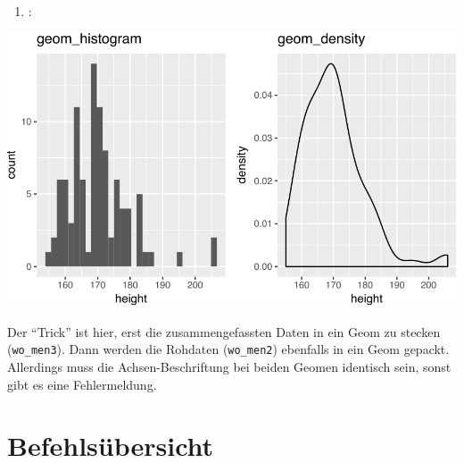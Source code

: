 \documentclass[12pt,ngerman,]{book}
\newenvironment{Shaded}{\begin{snugshade}}{\end{snugshade}}
\newcommand{\KeywordTok}[1]{\textcolor[rgb]{0.13,0.29,0.53}{\textbf{{#1}}}}
\newcommand{\DataTypeTok}[1]{\textcolor[rgb]{0.13,0.29,0.53}{{#1}}}
\newcommand{\DecValTok}[1]{\textcolor[rgb]{0.00,0.00,0.81}{{#1}}}
\newcommand{\StringTok}[1]{\textcolor[rgb]{0.31,0.60,0.02}{{#1}}}
\newcommand{\NormalTok}[1]{{#1}}
\providecommand{\tightlist}{%
  \setlength{\itemsep}{0pt}\setlength{\parskip}{0pt}}
\renewenvironment{Shaded}{\begin{kframe}}{\end{kframe}}
\begin{document}
\begin{enumerate}
\def\labelenumi{\arabic{enumi}.}
\setcounter{enumi}{3}
\tightlist
\item
  :
\end{enumerate}

\begin{Shaded}
\end{Shaded}

\begin{center}\includegraphics[width=0.7\linewidth]{050_Daten_visualisieren_files/figure-latex/unnamed-chunk-33-1} \end{center}

Der ``Trick'' ist hier, erst die zusammengefassten Daten in ein Geom zu
stecken (\texttt{wo\_men3}). Dann werden die Rohdaten
(\texttt{wo\_men2}) ebenfalls in ein Geom gepackt. Allerdings muss die
Achsen-Beschriftung bei beiden Geomen identisch sein, sonst gibt es eine
Fehlermeldung.

\section{Befehlsübersicht}\label{befehlsubersicht-5}
\end{document}
